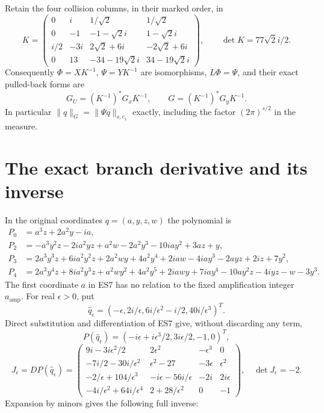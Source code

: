 \documentclass[11pt]{article}
\begin{document}
Retain the four collision columns, in their marked order, in
\[
 K=\begin{pmatrix}
 0&i&1/\sqrt2&1/\sqrt2\\
 0&-1&-1-\sqrt2 i&1-\sqrt2 i\\
 i/2&-3i&2\sqrt2+6i&-2\sqrt2+6i\\
 0&13&-34-19\sqrt2 i&34-19\sqrt2 i
 \end{pmatrix},\qquad \det K=77\sqrt2 i/2.
 \tag{ES5}
\]
Consequently $\Phi=XK^{-1}$, $\Psi=YK^{-1}$ are isomorphisms,
$L\Phi=\Psi$, and their exact pulled-back forms are
\[
 G_U=(K^{-1})^*G_xK^{-1},\qquad G=(K^{-1})^*G_yK^{-1}.
 \tag{ES6}
\]
In particular $\|q\|_G=\|\Psi q\|_{s,c_1}$ exactly, including
the factor $(2\pi)^{s/2}$ in the measure.

\section{The exact branch derivative and its inverse}
In the original coordinates $q=(a,y,z,w)$ the polynomial is
\[
\begin{aligned}
P_0&=a^3z+2a^2y-ia,\\
P_2&=-a^3y^2z-2ia^2yz+a^2w-2a^2y^3-10iay^2+3az+y,\\
P_3&=2a^3y^3z+6ia^2y^2z+2a^2wy+4a^2y^4+2iaw-4iay^3-2ayz+2iz+7y^2,\\
P_4&=2a^3y^4z+8ia^2y^3z+a^2wy^2+4a^2y^5+2iawy+7iay^4-10ay^2z-4iyz-w-3y^3.
\end{aligned}\tag{ES7}
\]
The first coordinate $a$ in ES7 has no relation to the fixed
amplification integer $a_{\mathrm{amp}}$. For real $\epsilon>0$, put
\[
 \widehat q_\epsilon=(-\epsilon,2i/\epsilon,6i/\epsilon^2-i/2,40i/\epsilon^3)^T.
\]
Direct substitution and differentiation of ES7 give, without
discarding any term,
\[
 P(\widehat q_\epsilon)=(-i\epsilon+i\epsilon^3/2,3i\epsilon/2,-1,0)^T,
 \tag{ES8}
\]
\[
 J_\epsilon=DP(\widehat q_\epsilon)=
 \begin{pmatrix}
 9i-3i\epsilon^2/2&2\epsilon^2&-\epsilon^3&0\\
 -7i/2-30i/\epsilon^2&\epsilon^2-27&-3\epsilon&\epsilon^2\\
 -2/\epsilon+104/\epsilon^3&-i\epsilon-56i/\epsilon&-2i&2i\epsilon\\
 -4i/\epsilon^2+64i/\epsilon^4&2+28/\epsilon^2&0&-1
 \end{pmatrix},\quad\det J_\epsilon=-2.
 \tag{ES9}
\]
Expansion by minors gives the following full inverse:
\end{document}
